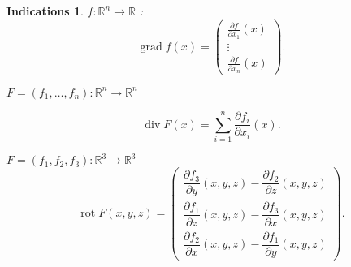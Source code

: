 \documentclass[11pt,a4paper]{article}
\newcommand{\Rr}{\mathbb{R}} \newcommand{\R}{\mathbb{R}}
\theoremstyle{exostyle}
\newtheorem{ind}{Indications}
\newcommand{\indication}{\begin{ind}} \newcommand{\finindication}{\end{ind}}
\newcommand{\grad}{\operatorname{grad}} %
\newcommand{\diver}{\operatorname{div}}
\newcommand{\rot}{\operatorname{rot}}
\begin{document}
\finenonce

\indication
$f : \Rr^n \to \Rr$ :
$$\grad f (x) = \begin{pmatrix}
	\frac{\partial f}{\partial x_1}(x)\\
	\vdots \\
	\frac{\partial f}{\partial x_n}(x)
\end{pmatrix}.$$


$F = (f_1,\ldots,f_n) : \Rr^n \to \Rr^n$ 

$$\diver F (x) = \sum_{i=1}^n \frac{\partial f_i}{\partial x_i}(x).$$


$F = (f_1,f_2,f_3) : \Rr^3 \to \Rr^3$ 
$$\rot F (x,y,z)=
\begin{pmatrix}
	\dfrac{\partial f_3}{\partial y}(x,y,z)-\dfrac{\partial f_2}{\partial z}(x,y,z) \\[2ex]
	\dfrac{\partial f_1}{\partial z}(x,y,z)-\dfrac{\partial f_3}{\partial x}(x,y,z) \\[2ex]
	\dfrac{\partial f_2}{\partial x}(x,y,z)-\dfrac{\partial f_1}{\partial y}(x,y,z)
\end{pmatrix}.
$$
\finindication
\end{document}

